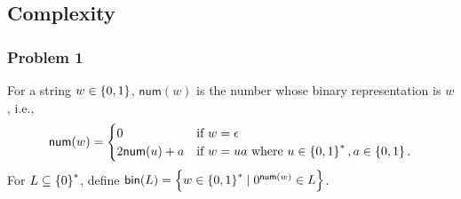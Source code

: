 \documentclass{article}
\newcommand{\num}{\mathsf{num}}
\newcommand{\bin}{\mathsf{bin}}
\begin{document}
\subsection{Complexity}

\subsubsection{Problem 1}
For a string \(w \in \set{0,1}\), \(\num(w)\) is the number whose binary representation is \(w\), i.e.,
\[
    \num(w)
    =%
    \begin{cases}
        0 &\text{if } w = \epsilon\\
        2 \num(u) + a &\text{if } w = ua \text{ where } u \in \set{0,1}^*, a \in \set{0,1}.
    \end{cases}
\]
For \(L \subseteq \set{0}^*\), define \(\bin(L) = \set{w \in \set{0,1}^* \mid 0^{\num(w)} \in L}\).
\end{document}
